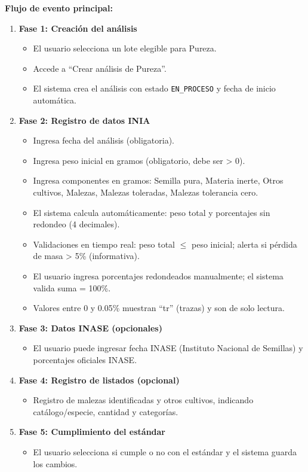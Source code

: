 \vspace{0.5em}
\noindent\textbf{Flujo de evento principal:}
\begin{enumerate}[nosep]
    \item \textbf{Fase 1: Creación del análisis}
    \begin{itemize}[nosep]
        \item El usuario selecciona un lote elegible para Pureza.
        \item Accede a ``Crear análisis de Pureza''.
        \item El sistema crea el análisis con estado \texttt{EN\_PROCESO} y fecha de inicio automática.
    \end{itemize}
    \item \textbf{Fase 2: Registro de datos INIA}
    \begin{itemize}[nosep]
        \item Ingresa fecha del análisis (obligatoria).
        \item Ingresa peso inicial en gramos (obligatorio, debe ser > 0).
        \item Ingresa componentes en gramos: Semilla pura, Materia inerte, Otros cultivos, Malezas, Malezas toleradas, Malezas tolerancia cero.
        \item El sistema calcula automáticamente: peso total y porcentajes sin redondeo (4 decimales).
        \item Validaciones en tiempo real: peso total $\leq$ peso inicial; alerta si pérdida de masa > 5\% (informativa).
        \item El usuario ingresa porcentajes redondeados manualmente; el sistema valida suma = 100\%.
        \item Valores entre 0 y 0.05\% muestran ``tr'' (trazas) y son de solo lectura.
    \end{itemize}
    \item \textbf{Fase 3: Datos INASE (opcionales)}
    \begin{itemize}[nosep]
        \item El usuario puede ingresar fecha INASE (Instituto Nacional de Semillas) y porcentajes oficiales INASE.
    \end{itemize}
    \item \textbf{Fase 4: Registro de listados (opcional)}
    \begin{itemize}[nosep]
        \item Registro de malezas identificadas y otros cultivos, indicando catálogo/especie, cantidad y categorías.
    \end{itemize}
    \item \textbf{Fase 5: Cumplimiento del estándar}
    \begin{itemize}[nosep]
        \item El usuario selecciona si cumple o no con el estándar y el sistema guarda los cambios.
    \end{itemize}
\end{enumerate}

